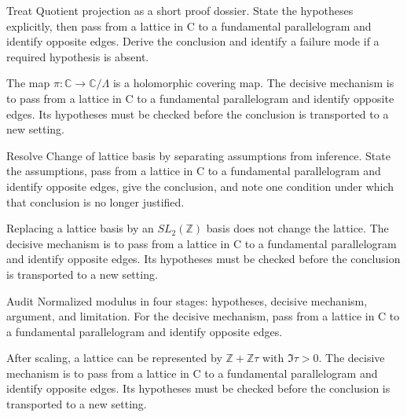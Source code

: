 \begin{problem}\label{prob:iv27-problem-04}
Treat Quotient projection as a short proof dossier. State the hypotheses explicitly, then pass from a lattice in C to a fundamental parallelogram and identify opposite edges. Derive the conclusion and identify a failure mode if a required hypothesis is absent.
\end{problem}
\begin{solution}
The map $\pi:\mathbb C\to\mathbb C/\Lambda$ is a holomorphic covering map. The decisive mechanism is to pass from a lattice in C to a fundamental parallelogram and identify opposite edges. Its hypotheses must be checked before the conclusion is transported to a new setting.
\end{solution}

\begin{problem}\label{prob:iv27-problem-05}
Resolve Change of lattice basis by separating assumptions from inference. State the assumptions, pass from a lattice in C to a fundamental parallelogram and identify opposite edges, give the conclusion, and note one condition under which that conclusion is no longer justified.
\end{problem}
\begin{solution}
Replacing a lattice basis by an $SL_2(\mathbb Z)$ basis does not change the lattice. The decisive mechanism is to pass from a lattice in C to a fundamental parallelogram and identify opposite edges. Its hypotheses must be checked before the conclusion is transported to a new setting.
\end{solution}

\begin{problem}\label{prob:iv27-problem-06}
Audit Normalized modulus in four stages: hypotheses, decisive mechanism, argument, and limitation. For the decisive mechanism, pass from a lattice in C to a fundamental parallelogram and identify opposite edges.
\end{problem}
\begin{solution}
After scaling, a lattice can be represented by $\mathbb Z+\mathbb Z\tau$ with $\Im\tau>0$. The decisive mechanism is to pass from a lattice in C to a fundamental parallelogram and identify opposite edges. Its hypotheses must be checked before the conclusion is transported to a new setting.
\end{solution}

